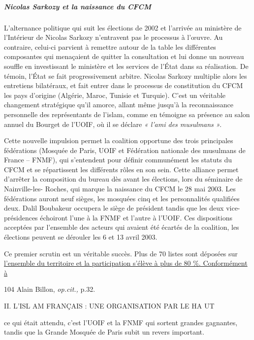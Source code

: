 \hypertarget{nicolas-sarkozy-et-la-naissance-du-cfcm}{%
\subparagraph{Nicolas Sarkozy et la naissance du
CFCM}\label{nicolas-sarkozy-et-la-naissance-du-cfcm}}


L'alternance politique qui suit les élections de 2002 et l'arrivée au
ministère de l'Intérieur de Nicolas Sarkozy n'entravent pas le processus
à l'œuvre. Au contraire, celui-ci parvient à remettre autour de la table
les différentes composantes qui menaçaient de quitter la consultation et
lui donne un nouveau souffle en investissant le ministère et les
services de l'État dans sa réalisation. De témoin, l'État se fait
progressivement arbitre. Nicolas Sarkozy multiplie alors les entretiens
bilatéraux, et fait entrer dans le processus de constitution du CFCM les
pays d'origine (Algérie, Maroc, Tunisie et Turquie). C'est un véritable
changement stratégique qu'il amorce, allant même jusqu'à la
reconnaissance personnelle des représentants de l'islam, comme en
témoigne sa présence au salon annuel du Bourget de l'UOIF, où il se
déclare \emph{« l'ami des musulmans ».}

Cette nouvelle impulsion permet la coalition opportune des trois
principales fédérations (Mosquée de Paris, UOIF et Fédération nationale
des musulmans de France -- FNMF), qui s'entendent pour définir
communément les statuts du CFCM et se répartissent les différents rôles
en son sein. Cette alliance permet d'arrêter la composition du bureau
dès avant les élections, lors du séminaire de Nainville-les- Roches, qui
marque la naissance du CFCM le 28 mai 2003. Les fédérations auront neuf
sièges, les mosquées cinq et les personnalités qualifiées deux. Dalil
Boubakeur occupera le siège de président tandis que les deux
vice-présidences échoiront l'une à la FNMF et l'autre à l'UOIF. Ces
dispositions acceptées par l'ensemble des acteurs qui avaient été
écartés de la coalition, les élections peuvent se dérouler les 6 et 13
avril 2003.

Ce premier scrutin est un véritable succès. Plus de 70 listes sont
déposées sur \underline{l'ensemble du territoire et la participation
s'élève à plus de 80 \%. Conformément à}

104 Alain Billon, \emph{op.cit.,} p.32.

II. L'ISL AM FRANÇAIS : UNE ORGANISATION PAR LE HA UT

ce qui était attendu, c'est l'UOIF et la FNMF qui sortent grandes
gagnantes, tandis que la Grande Mosquée de Paris subit un revers
important.


